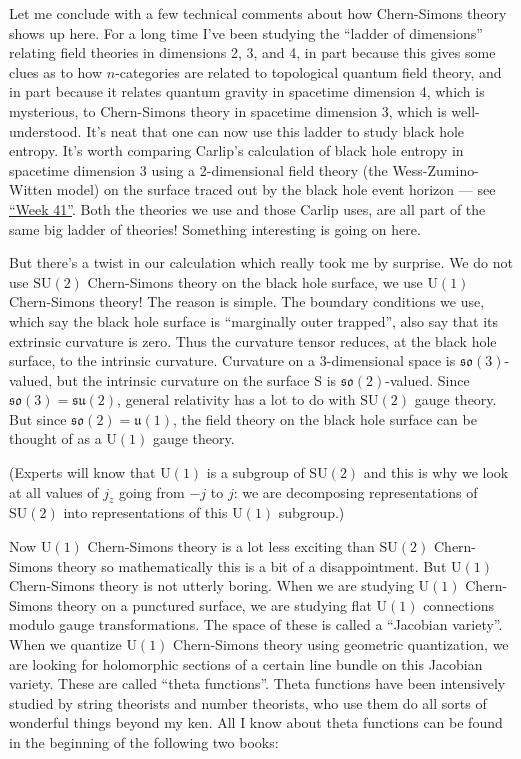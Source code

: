 \documentclass{article}
\begin{document}
Let me conclude with a few technical comments about how Chern-Simons
theory shows up here. For a long time I've been studying the ``ladder of
dimensions'' relating field theories in dimensions 2, 3, and 4, in part
because this gives some clues as to how \(n\)-categories are related to
topological quantum field theory, and in part because it relates quantum
gravity in spacetime dimension 4, which is mysterious, to Chern-Simons
theory in spacetime dimension 3, which is well-understood. It's neat
that one can now use this ladder to study black hole entropy. It's worth
comparing Carlip's calculation of black hole entropy in spacetime
dimension 3 using a 2-dimensional field theory (the Wess-Zumino-Witten
model) on the surface traced out by the black hole event horizon --- see
\protect\hyperlink{week41}{``Week 41''}. Both the theories we use and
those Carlip uses, are all part of the same big ladder of theories!
Something interesting is going on here.

But there's a twist in our calculation which really took me by surprise.
We do not use \(\mathrm{SU}(2)\) Chern-Simons theory on the black hole
surface, we use \(\mathrm{U}(1)\) Chern-Simons theory! The reason is
simple. The boundary conditions we use, which say the black hole surface
is ``marginally outer trapped'', also say that its extrinsic curvature
is zero. Thus the curvature tensor reduces, at the black hole surface,
to the intrinsic curvature. Curvature on a 3-dimensional space is
\(\mathfrak{so}(3)\)-valued, but the intrinsic curvature on the surface
S is \(\mathfrak{so}(2)\)-valued. Since
\(\mathfrak{so}(3) = \mathfrak{su}(2)\), general relativity has a lot to
do with \(\mathrm{SU}(2)\) gauge theory. But since
\(\mathfrak{so}(2) = \mathfrak{u}(1)\), the field theory on the black
hole surface can be thought of as a \(\mathrm{U}(1)\) gauge theory.

(Experts will know that \(\mathrm{U}(1)\) is a subgroup of
\(\mathrm{SU}(2)\) and this is why we look at all values of \(j_z\)
going from \(-j\) to \(j\): we are decomposing representations of
\(\mathrm{SU}(2)\) into representations of this \(\mathrm{U}(1)\)
subgroup.)

Now \(\mathrm{U}(1)\) Chern-Simons theory is a lot less exciting than
\(\mathrm{SU}(2)\) Chern-Simons theory so mathematically this is a bit
of a disappointment. But \(\mathrm{U}(1)\) Chern-Simons theory is not
utterly boring. When we are studying \(\mathrm{U}(1)\) Chern-Simons
theory on a punctured surface, we are studying flat \(\mathrm{U}(1)\)
connections modulo gauge transformations. The space of these is called a
``Jacobian variety''. When we quantize \(\mathrm{U}(1)\) Chern-Simons
theory using geometric quantization, we are looking for holomorphic
sections of a certain line bundle on this Jacobian variety. These are
called ``theta functions''. Theta functions have been intensively
studied by string theorists and number theorists, who use them do all
sorts of wonderful things beyond my ken. All I know about theta
functions can be found in the beginning of the following two books:
\end{document}
